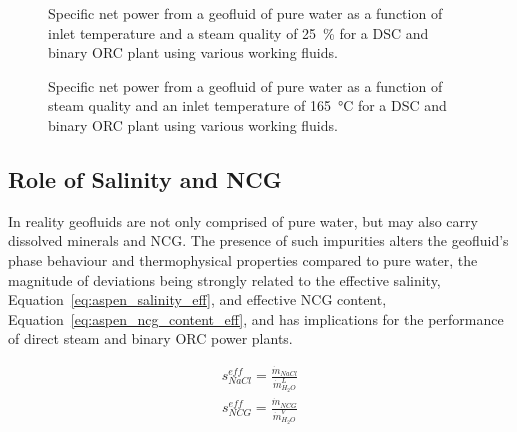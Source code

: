     \begin{figure}[H]
        \centering
        
        \caption[Specific net power from a geofluid of pure water by working fluid as a function of temperature.]{Specific net power from a geofluid of pure water as a function of inlet temperature and a steam quality of \qty{25}{\percent} for a \ac{DSC} and binary \ac{ORC} plant using various working fluids.}
        \label{fig:prosim_aspen_pureWAT_Tslice}
    \end{figure}
    
    \begin{figure}[H]
        \centering
        
        \caption[Specific net power from a geofluid of pure water by working fluid as a function of steam quality.]{Specific net power from a geofluid of pure water as a function of steam quality and an inlet temperature of \qty{165}{\degreeCelsius} for a \ac{DSC} and binary \ac{ORC} plant using various working fluids. }
        \label{fig:prosim_aspen_pureWAT_Qslice}
    \end{figure}

\subsection{Role of Salinity and NCG}  %
    In reality geofluids are not only comprised of pure water, but may also carry dissolved minerals and \ac{NCG}. The presence of such impurities alters the geofluid’s phase behaviour and thermophysical properties compared to pure water, the magnitude of deviations being strongly related to the effective salinity, Equation~\ref{eq:aspen_salinity_eff}, and effective \ac{NCG} content, Equation~\ref{eq:aspen_ncg_content_eff}, and has implications for the performance of direct steam and binary \ac{ORC} power plants.

    \begin{align}
        s_{NaCl}^{eff} = \frac{\Dot{m}_{NaCl}}{\Dot{m}_{H_2O}^L} \label{eq:aspen_salinity_eff}
    \end{align}
    \begin{align}
        s_{NCG}^{eff} = \frac{\Dot{m}_{NCG}}{\Dot{m}_{H_2O}^V} \label{eq:aspen_ncg_content_eff}
    \end{align}

